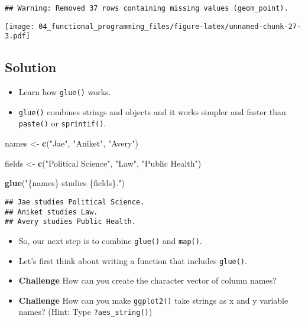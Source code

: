 \documentclass[
]{book}
\newenvironment{Shaded}{\begin{snugshade}}{\end{snugshade}}
\newcommand{\KeywordTok}[1]{\textcolor[rgb]{0.13,0.29,0.53}{\textbf{#1}}}
\newcommand{\NormalTok}[1]{#1}
\newcommand{\StringTok}[1]{\textcolor[rgb]{0.31,0.60,0.02}{#1}}
\begin{document}
\begin{verbatim}
## Warning: Removed 37 rows containing missing values (geom_point).
\end{verbatim}

\texttt{[image: 04\_functional\_programming\_files/figure-latex/unnamed-chunk-27-3.pdf]}

\hypertarget{solution}{%
\subsection{Solution}\label{solution}}

\begin{itemize}
\item
  Learn how \texttt{glue()} works.
\item
  \texttt{glue()} combines strings and objects and it works simpler and faster than \texttt{paste()} or \texttt{sprintif()}.
\end{itemize}

\begin{Shaded}
\begin{Highlighting}[]
\NormalTok{names \textless{}{-}}\StringTok{ }\KeywordTok{c}\NormalTok{(}\StringTok{"Jae"}\NormalTok{, }\StringTok{"Aniket"}\NormalTok{, }\StringTok{"Avery"}\NormalTok{)}

\NormalTok{fields \textless{}{-}}\StringTok{ }\KeywordTok{c}\NormalTok{(}\StringTok{"Political Science"}\NormalTok{, }\StringTok{"Law"}\NormalTok{, }\StringTok{"Public Health"}\NormalTok{)}

\KeywordTok{glue}\NormalTok{(}\StringTok{"\{names\} studies \{fields\}."}\NormalTok{)}
\end{Highlighting}
\end{Shaded}

\begin{verbatim}
## Jae studies Political Science.
## Aniket studies Law.
## Avery studies Public Health.
\end{verbatim}

\begin{itemize}
\item
  So, our next step is to combine \texttt{glue()} and \texttt{map()}.
\item
  Let's first think about writing a function that includes \texttt{glue()}.
\item
  \textbf{Challenge}
  How can you create the character vector of column names?
\item
  \textbf{Challenge}
  How can you make \texttt{ggplot2()} take strings as x and y variable names? (Hint: Type \texttt{?aes\_string()})
\end{itemize}
\end{document}
